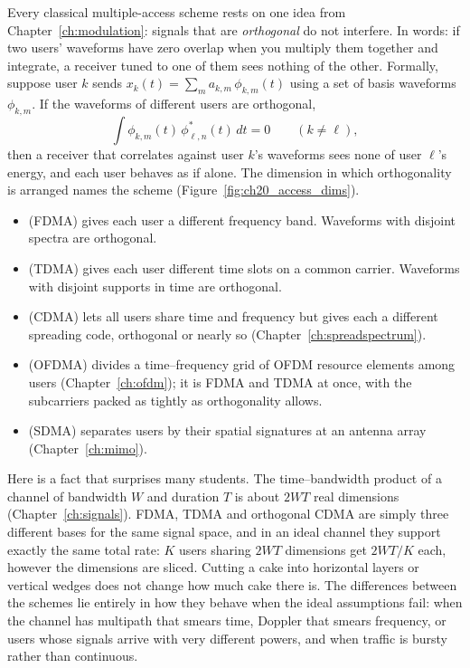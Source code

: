Every classical multiple-access scheme rests on one idea from Chapter~\ref{ch:modulation}: signals
that are \emph{orthogonal} do not interfere. In words: if two users' waveforms have zero overlap
when you multiply them together and integrate, a receiver tuned to one of them sees nothing of the
other. Formally, suppose user $k$ sends $x_k(t)=\sum_m a_{k,m}\,\phi_{k,m}(t)$ using a set of basis
waveforms $\phi_{k,m}$. If the waveforms of different users are orthogonal,
\begin{equation}
\int\phi_{k,m}(t)\,\phi^*_{\ell,n}(t)\,dt=0\qquad(k\ne\ell),
\label{eq:ch20:orth}
\end{equation}
then a receiver that correlates against user $k$'s waveforms sees none of user $\ell$'s energy,
and each user behaves as if alone. The dimension in which orthogonality is arranged names the
scheme (Figure~\ref{fig:ch20_access_dims}).
\begin{itemize}
\item {} (FDMA) gives each user a different frequency
band. Waveforms with disjoint spectra are orthogonal.
\item {} (TDMA) gives each user different time slots on a
common carrier. Waveforms with disjoint supports in time are orthogonal.
\item {} (CDMA) lets all users share time and frequency but
gives each a different spreading code, orthogonal or nearly so (Chapter~\ref{ch:spreadspectrum}).
\item {} (OFDMA) divides a time--frequency
grid of OFDM resource elements among users (Chapter~\ref{ch:ofdm}); it is FDMA and TDMA at once,
with the subcarriers packed as tightly as orthogonality allows.
\item {} (SDMA) separates users by their spatial signatures
at an antenna array (Chapter~\ref{ch:mimo}).
\end{itemize}

Here is a fact that surprises many students. The time--bandwidth product of a channel of bandwidth
$W$ and duration $T$ is about $2WT$ real dimensions (Chapter~\ref{ch:signals}). FDMA, TDMA and
orthogonal CDMA are simply three different bases for the same signal space, and in an ideal channel
they support exactly the same total rate: $K$ users sharing $2WT$ dimensions get $2WT/K$ each,
however the dimensions are sliced. Cutting a cake into horizontal layers or vertical wedges does
not change how much cake there is. The differences between the schemes lie entirely in how they
behave when the ideal assumptions fail: when the channel has multipath that smears time, Doppler
that smears frequency, or users whose signals arrive with very different powers, and when traffic
is bursty rather than continuous.

